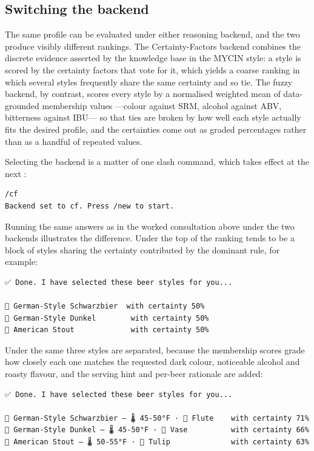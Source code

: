 \subsection{Switching the backend}

The same profile can be evaluated under either reasoning backend, and the two
produce visibly different rankings. The Certainty-Factors backend combines the
discrete evidence asserted by the knowledge base in the MYCIN style: a style is
scored by the certainty factors that vote for it, which yields a coarse ranking
in which several styles frequently share the same certainty and so tie. The fuzzy
backend, by contrast, scores every style by a normalised weighted mean of
data-grounded membership values ---colour against SRM, alcohol against
ABV, bitterness against IBU--- so that ties are broken by how
well each style actually fits the desired profile, and the certainties come out
as graded percentages rather than as a handful of repeated values.

Selecting the backend is a matter of one slash command, which takes effect at the
next :

\begin{lstlisting}[numbers=none]
/cf
Backend set to cf. Press /new to start.
\end{lstlisting}

Running the same answers as in the worked consultation above under the two
backends illustrates the difference. Under  the top of the ranking
tends to be a block of styles sharing the certainty contributed by the dominant
rule, for example:

\begin{lstlisting}[numbers=none]
✅ Done. I have selected these beer styles for you...

🍺 German-Style Schwarzbier  with certainty 50%
🍺 German-Style Dunkel        with certainty 50%
🍺 American Stout             with certainty 50%
\end{lstlisting}

Under  the same three styles are separated, because the membership
scores grade how closely each one matches the requested dark colour, noticeable
alcohol and roasty flavour, and the serving hint and per-beer rationale are added:

\begin{lstlisting}[numbers=none]
✅ Done. I have selected these beer styles for you...

🍺 German-Style Schwarzbier — 🌡 45-50°F · 🥃 Flute    with certainty 71%
🍺 German-Style Dunkel — 🌡 45-50°F · 🥃 Vase          with certainty 66%
🍺 American Stout — 🌡 50-55°F · 🥃 Tulip              with certainty 63%
\end{lstlisting}

